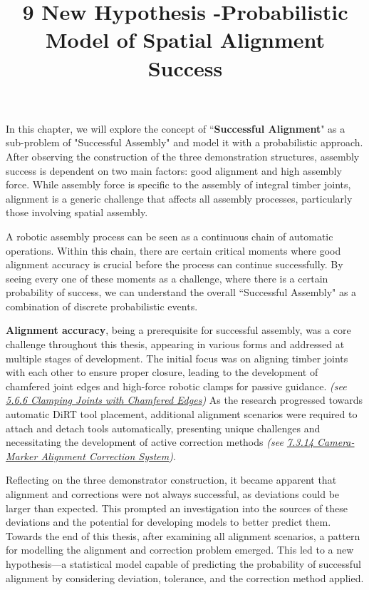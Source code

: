 \documentclass[11pt]{book}
\title{9 New Hypothesis -Probabilistic Model of Spatial Alignment Success}
\begin{document}
\maketitle

In this chapter, we will explore the concept of ``\textbf{Successful Alignment}" as a sub-problem of "Successful Assembly" and model it with a probabilistic approach. After observing the construction of the three demonstration structures, assembly success is dependent on two main factors: good alignment and high assembly force. While assembly force is specific to the assembly of integral timber joints, alignment is a generic challenge that affects all assembly processes, particularly those involving spatial assembly.

A robotic assembly process can be seen as a continuous chain of automatic operations. Within this chain, there are certain critical moments where good alignment accuracy is crucial before the process can continue successfully. By seeing every one of these moments as a challenge, where there is a certain probability of success, we can understand the overall ``Successful Assembly" as a combination of discrete probabilistic events.

\textbf{Alignment accuracy}, being a prerequisite for successful assembly, was a core challenge throughout this thesis, appearing in various forms and addressed at multiple stages of development. The initial focus was on aligning timber joints with each other to ensure proper closure, leading to the development of chamfered joint edges and high-force robotic clamps for passive guidance. \textit{(see \uline{5.6.6 Clamping Joints with Chamfered Edges})} As the research progressed towards automatic DiRT tool placement, additional alignment scenarios were required to attach and detach tools automatically, presenting unique challenges and necessitating the development of active correction methods \textit{(see \uline{7.3.14 Camera-Marker Alignment Correction System})}.

Reflecting on the three demonstrator construction, it became apparent that alignment and corrections were not always successful, as deviations could be larger than expected. This prompted an investigation into the sources of these deviations and the potential for developing models to better predict them. Towards the end of this thesis, after examining all alignment scenarios, a pattern for modelling the alignment and correction problem emerged. This led to a new hypothesis—a statistical model capable of predicting the probability of successful alignment by considering deviation, tolerance, and the correction method applied.
\end{document}
